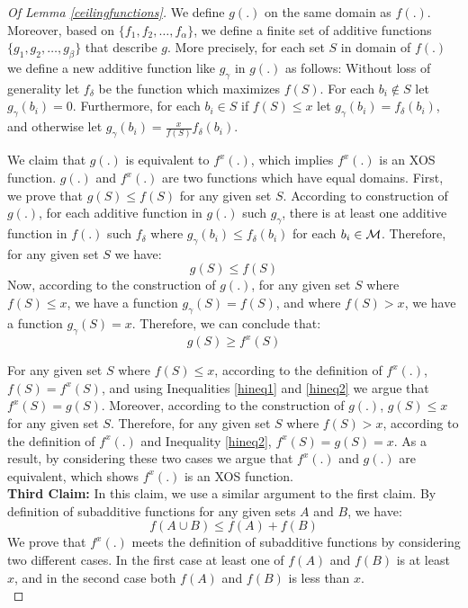 \begin{proof}[Of Lemma \ref{ceilingfunctions}]
We define $g(.)$ on the same domain as $f(.)$. Moreover, based on $\{f_1, f_2, \ldots, f_{\alpha}\}$, we define a finite set of additive functions $\{g_1, g_2, \ldots, g_{\beta}\}$ that describe $g$. More precisely, for each set $S$ in domain of $f(.)$ we define a new additive function like $g_{\gamma}$ in $g(.)$ as follows: Without loss of generality let $f_{\delta}$ be the function which maximizes $f(S)$. For each $b_i \notin S$ let $g_{\gamma}(b_i) = 0$. Furthermore, for each $b_i \in S$ if $f(S) \leq x$ let $g_{\gamma}(b_i) = f_{\delta}(b_i)$, and otherwise let $g_{\gamma}(b_i) = \frac{x}{f(S)} f_{\delta}(b_i)$. 

We claim that $g(.)$ is equivalent to $f^x(.)$, which implies $f^x(.)$ is an XOS function. $g(.)$ and $f^x(.)$ are two functions which have equal domains. First, we prove that $g(S) \leq f(S)$ for any given set $S$. According to construction of $g(.)$, for each additive function in $g(.)$ such $g_{\gamma}$, there is at least one additive function in $f(.)$ such $f_{\delta}$ where $g_{\gamma}(b_i) \leq f_{\delta}(b_i)$ for each $b_i \in \mathcal{M}$. Therefore, for any given set $S$ we have:
 \begin{equation}\label{hineq1} g(S) \leq f(S)  \end{equation} 
Now, according to the construction of $g(.)$, for any given set $S$ where $f(S) \leq x$, we have a function $g_{\gamma}(S) = f(S)$, and where $f(S) > x$, we have a function $g_{\gamma}(S) = x$. Therefore, we can conclude that: 
 \begin{equation}\label{hineq2} g(S) \geq f^x(S)  \end{equation} 
 
For any given set $S$ where $f(S) \leq x$, according to the definition of $f^x(.)$, $f(S) = f^x(S)$, and using Inequalities \eqref{hineq1} and \eqref{hineq2} we argue that $f^x(S) = g(S)$. Moreover, according to the construction of $g(.)$, $g(S) \leq x$ for any given set $S$. Therefore, for any given set $S$ where $f(S) > x$, according to the definition of $f^x(.)$ and Inequality \eqref{hineq2}, $f^x(S) = g(S) = x$. As a result, by considering these two cases we argue that $f^x(.)$ and $g(.)$ are equivalent, which shows $f^x(.)$ is an XOS function.\\
\textbf{Third Claim:} In this claim, we use a similar argument to the first claim. By definition of subadditive functions for any given sets $A$ and $B$, we have:
$$f(A \cup B) \leq f(A) + f(B)$$
We prove that $f^x(.)$ meets the definition of subadditive functions by considering two different cases. In the first case at least one of $f(A)$ and $f(B)$ is at least $x$, and in the second case both $f(A)$ and $f(B)$ is less than $x$.\\


\end{proof}
